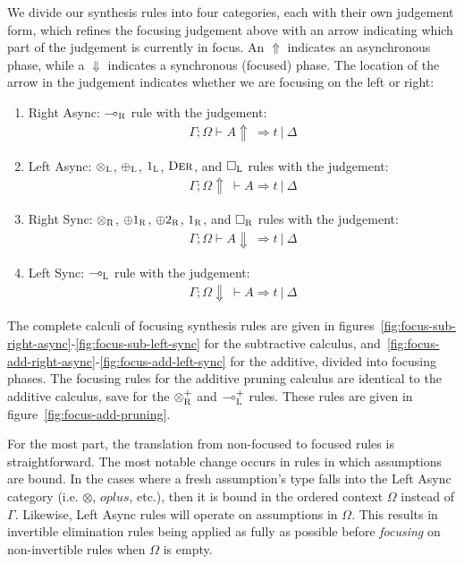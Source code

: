 We divide our synthesis rules into four categories, each with their own
judgement form, which refines the focusing judgement above with an arrow
indicating which part of the judgement is currently in focus. An $\Uparrow$
indicates an asynchronous phase, while a $\Downarrow$ indicates a synchronous
(focused) phase. The location of the arrow in the judgement indicates whether we
are focusing on the left or right:
\begin{enumerate}
  \item Right Async: $\multimap_{\textsc{R}}$ rule with the judgement:
        \begin{align*}\Gamma ; \Omega \vdash A \Uparrow\ \Rightarrow t\ |\ \Delta \end{align*}
        \item Left Async:  $\otimes_{\textsc{L}}$, $\oplus_{\textsc{L}}$, $1_{\textsc{L}}$, $\textsc{Der}$, and $\Box_{\textsc{L}}$ rules with the judgement:
        \begin{align*}\Gamma ; \Omega \Uparrow\ \vdash A \Rightarrow t\ |\ \Delta \end{align*}
        \item Right Sync:  $\otimes_{\textsc{R}}$, $\oplus1_{\textsc{R}}$, $\oplus2_{\textsc{R}}$, $1_{\textsc{R}}$, and $\Box_{\textsc{R}}$ rules with the judgement:
        \begin{align*}\Gamma ; \Omega \vdash A \Downarrow\ \Rightarrow t\ |\ \Delta \end{align*}
        \item Left Sync:   $\multimap_{\textsc{L}}$ rule with the judgement:
        \begin{align*}\Gamma ; \Omega \Downarrow\ \vdash A \Rightarrow t\ |\ \Delta \end{align*}
\end{enumerate}

The complete calculi of focusing synthesis rules are given in
figures~\ref{fig:focus-sub-right-async}-\ref{fig:focus-sub-left-sync} for the
subtractive calculus,
and~\ref{fig:focus-add-right-async}-\ref{fig:focus-add-left-sync} for the
additive, divided into focusing phases. The focusing rules for the additive pruning 
calculus are identical to the additive calculus, save for the $\otimes^{+}_{\textsc{R}}$ and 
$\multimap^{+}_{\textsc{L}}$ rules. These rules are given in figure~\ref{fig:focus-add-pruning}.

For the most part, the translation from
non-focused to focused rules is straightforward. The most notable change occurs
in rules in which assumptions are bound. In the cases where a fresh assumption's
type falls into the Left Async category (i.e. $\otimes$, $oplus$, etc.), then it is bound in the
ordered context $\Omega$ instead of $\Gamma$. Likewise, Left Async rules will
operate on assumptions in $\Omega$. This results in invertible elimination rules
being applied as fully as possible before \textit{focusing} on non-invertible
rules when $\Omega$ is empty.

